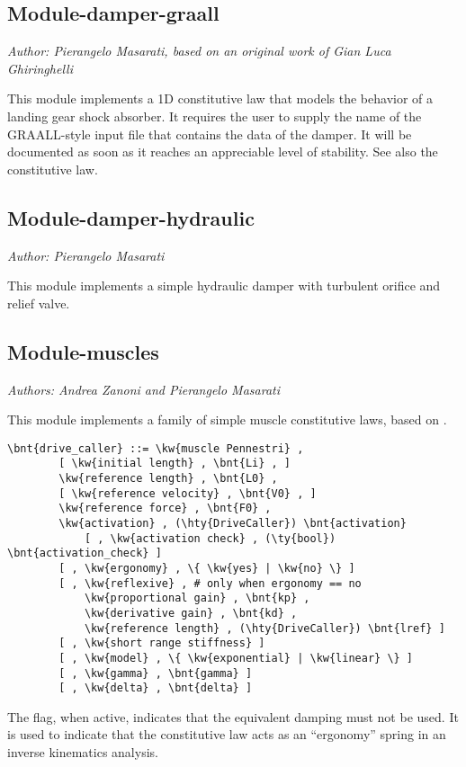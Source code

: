 \subsection{Module-damper-graall}
\emph{Author: Pierangelo Masarati, based on an original work of Gian Luca Ghiringhelli}

This module implements a 1D constitutive law that models
the behavior of a landing gear shock absorber.
It requires the user to supply the name of the GRAALL-style 
input file that contains the data of the damper.
It will be documented as soon as it reaches an appreciable level
of stability.
See also the 
constitutive law.

\subsection{Module-damper-hydraulic}
\emph{Author: Pierangelo Masarati}

\noindent
This module implements a simple hydraulic damper with turbulent orifice and relief valve.

\subsection{Module-muscles}
\emph{Authors: Andrea Zanoni and Pierangelo Masarati}

\bigskip

\noindent
This module implements a family of simple muscle constitutive laws,
based on \cite{PENNESTRI-2007-JB}.
\begin{Verbatim}[commandchars=\\\{\}]
    \bnt{drive_caller} ::= \kw{muscle Pennestri} ,
        [ \kw{initial length} , \bnt{Li} , ]
        \kw{reference length} , \bnt{L0} ,
        [ \kw{reference velocity} , \bnt{V0} , ]
        \kw{reference force} , \bnt{F0} ,
        \kw{activation} , (\hty{DriveCaller}) \bnt{activation}
            [ , \kw{activation check} , (\ty{bool}) \bnt{activation_check} ]
        [ , \kw{ergonomy} , \{ \kw{yes} | \kw{no} \} ]
        [ , \kw{reflexive} , # only when ergonomy == no
            \kw{proportional gain} , \bnt{kp} ,
            \kw{derivative gain} , \bnt{kd} ,
            \kw{reference length} , (\hty{DriveCaller}) \bnt{lref} ]
        [ , \kw{short range stiffness} ]
        [ , \kw{model} , \{ \kw{exponential} | \kw{linear} \} ]
        [ , \kw{gamma} , \bnt{gamma} ]
        [ , \kw{delta} , \bnt{delta} ]
\end{Verbatim}
The  flag, when active, indicates that the equivalent damping
must not be used.
It is used to indicate that the constitutive law acts as an ``ergonomy''
spring in an inverse kinematics analysis.

